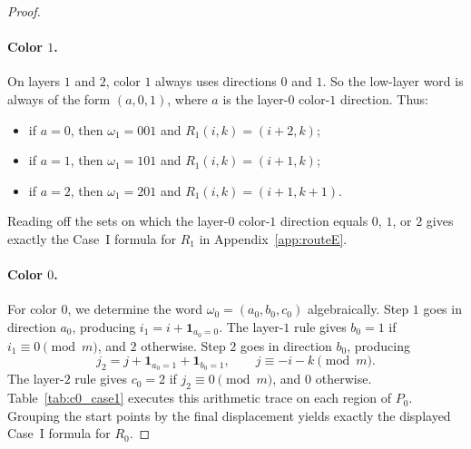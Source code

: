 \begin{proof}
\paragraph{Color $1$.}
On layers $1$ and $2$, color $1$ always uses directions $0$ and $1$.
So the low-layer word is always of the form $(a,0,1)$, where $a$ is the layer-$0$ color-$1$ direction.
Thus:
\begin{itemize}[leftmargin=2em]
\item if $a=0$, then $\omega_1=001$ and $R_1(i,k)=(i+2,k)$;
\item if $a=1$, then $\omega_1=101$ and $R_1(i,k)=(i+1,k)$;
\item if $a=2$, then $\omega_1=201$ and $R_1(i,k)=(i+1,k+1)$.
\end{itemize}
Reading off the sets on which the layer-$0$ color-$1$ direction equals $0$, $1$, or $2$ gives exactly the Case~I formula for $R_1$ in Appendix~\ref{app:routeE}.

\paragraph{Color $0$.}
For color $0$, we determine the word $\omega_0=(a_0,b_0,c_0)$ algebraically.
Step $1$ goes in direction $a_0$, producing $i_1=i+\mathbf{1}_{a_0=0}$.
The layer-$1$ rule gives $b_0=1$ if $i_1\equiv 0 \pmod m$, and $2$ otherwise.
Step $2$ goes in direction $b_0$, producing
\[
j_2=j+\mathbf{1}_{a_0=1}+\mathbf{1}_{b_0=1},\qquad j\equiv -i-k \pmod m.
\]
The layer-$2$ rule gives $c_0=2$ if $j_2\equiv 0 \pmod m$, and $0$ otherwise.
Table~\ref{tab:c0_case1} executes this arithmetic trace on each region of $P_0$.
Grouping the start points by the final displacement yields exactly the displayed Case~I formula for $R_0$.


\end{proof}
